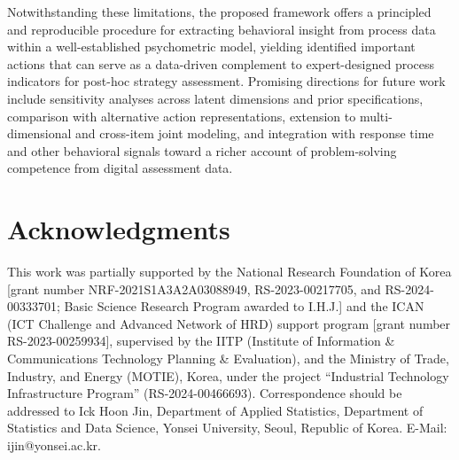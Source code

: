 \documentclass[A4paper,11pt]{article}
\begin{document}
Notwithstanding these limitations, the proposed framework offers a principled and reproducible procedure for extracting behavioral insight from process data within a well-established psychometric model, yielding identified important actions that can serve as a data-driven complement to expert-designed process indicators for post-hoc strategy assessment. Promising directions for future work include sensitivity analyses across latent dimensions and prior specifications, comparison with alternative action representations, extension to multi-dimensional and cross-item joint modeling, and integration with response time and other behavioral signals toward a richer account of problem-solving competence from digital assessment data.

\section*{Acknowledgments}

This work was partially supported by the National Research Foundation of Korea [grant number NRF-2021S1A3A2A03088949, RS-2023-00217705, and RS-2024-00333701; Basic Science Research Program awarded to I.H.J.] and the ICAN (ICT Challenge and Advanced Network of HRD) support program [grant number RS-2023-00259934], supervised by the IITP (Institute of Information \& Communications Technology Planning \& Evaluation), and the Ministry of Trade, Industry, and Energy (MOTIE), Korea, under the project ``Industrial Technology Infrastructure Program'' (RS-2024-00466693). Correspondence should be addressed to Ick Hoon Jin, Department of Applied Statistics, Department of Statistics and Data Science, Yonsei University, Seoul, Republic of Korea. E-Mail: ijin@yonsei.ac.kr. 

\newpage
%


\end{document}
